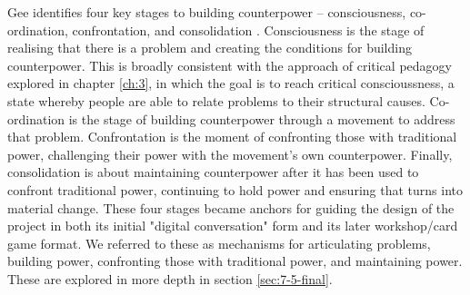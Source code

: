 Gee identifies four key stages to building counterpower – consciousness, co-ordination, confrontation, and consolidation \citep[p. 130]{gee_counterpower_2011}. Consciousness is the stage of realising that there is a problem and creating the conditions for building counterpower. This is broadly consistent with the approach of critical pedagogy explored in chapter \ref{ch:3}, in which the goal is to reach critical conscioussness,  a state whereby people are able to relate problems to their structural causes. Co-ordination is the stage of building counterpower through a movement to address that problem. Confrontation is the moment of confronting those with traditional power, challenging their power with the movement’s own counterpower. Finally, consolidation is about maintaining counterpower after it has been used to confront traditional power, continuing to hold power and ensuring that turns into material change. These four stages became anchors for guiding the design of the project in both its initial "digital conversation" form and its later workshop/card game format. We referred to these as mechanisms for articulating problems, building power, confronting those with traditional power, and maintaining power. These are explored in more depth in section \ref{sec:7-5-final}. 

